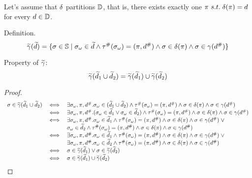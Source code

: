 

Let's assume that $\delta$ partitions $\mathbb{D}$, that is,
there exists exactly one $\pi\ s.t. \; \delta(\pi)=d$
for every $d \in \mathbb{D}$.

\bigskip

Definition.
\[
  \widetilde{\gamma}(\widetilde{d}) = \{
    \sigma \in \mathbb{S} \mid
    {\sigma}_\omega \in \widetilde{d} \wedge
    {\tau}^{\#}({\sigma}_\omega) = (\pi, {d}^{\#}) \wedge
    \sigma \in \delta(\pi) \wedge
    \sigma \in \gamma({d}^{\#})
  \}
\]

Property of $\widetilde{\gamma}$:
\[
  \widetilde{\gamma}(\widetilde{d}_1 \cup \widetilde{d}_2) = \widetilde{\gamma}(\widetilde{d}_1) \cup \widetilde{\gamma}(\widetilde{d}_2)
\]

\begin{proof}

\[
  \begin{array}{rcl}
    \sigma \in \widetilde{\gamma}(\widetilde{d}_1 \cup \widetilde{d}_2)
    &\iff& \exists {\sigma}_\omega,\pi,{d}^{\#}. {\sigma}_\omega \in (\widetilde{d}_1 \cup \widetilde{d}_2) \wedge
      {\tau}^{\#}({\sigma}_\omega) = (\pi, {d}^{\#}) \wedge
      \sigma \in \delta(\pi) \wedge
      \sigma \in \gamma({d}^{\#}) \\
    &\iff& \exists {\sigma}_\omega,\pi,{d}^{\#}. ({\sigma}_\omega \in \widetilde{d}_1 \lor {\sigma}_\omega \in \widetilde{d}_2) \wedge
      {\tau}^{\#}({\sigma}_\omega) = (\pi, {d}^{\#}) \wedge
      \sigma \in \delta(\pi) \wedge
      \sigma \in \gamma({d}^{\#}) \\
    &\iff& \exists {\sigma}_\omega,\pi,{d}^{\#}. {\sigma}_\omega \in \widetilde{d}_1 \wedge
      {\tau}^{\#}({\sigma}_\omega) = (\pi, {d}^{\#}) \wedge
      \sigma \in \delta(\pi) \wedge
      \sigma \in \gamma({d}^{\#}) \; \lor\\
    && {\sigma}_\omega \in \widetilde{d}_2 \wedge
      {\tau}^{\#}({\sigma}_\omega) = (\pi, {d}^{\#}) \wedge
      \sigma \in \delta(\pi) \wedge
      \sigma \in \gamma({d}^{\#}) \\
    &\iff& \exists {\sigma}_\omega,\pi,{d}^{\#}. {\sigma}_\omega \in \widetilde{d}_1 \wedge
      {\tau}^{\#}({\sigma}_\omega) = (\pi, {d}^{\#}) \wedge
      \sigma \in \delta(\pi) \wedge
      \sigma \in \gamma({d}^{\#}) \; \lor \\
    && \exists {\sigma}_\omega,\pi,{d}^{\#}. {\sigma}_\omega \in \widetilde{d}_2 \wedge
      {\tau}^{\#}({\sigma}_\omega) = (\pi, {d}^{\#}) \wedge
      \sigma \in \delta(\pi) \wedge
      \sigma \in \gamma({d}^{\#}) \\
    &\iff& \sigma \in \widetilde{\gamma}(\widetilde{d}_1) \lor \sigma \in \widetilde{\gamma}(\widetilde{d}_2) \\
    &\iff& \sigma \in \widetilde{\gamma}(\widetilde{d}_1) \cup \widetilde{\gamma}(\widetilde{d}_2)
  \end{array}
\]
\end{proof}

